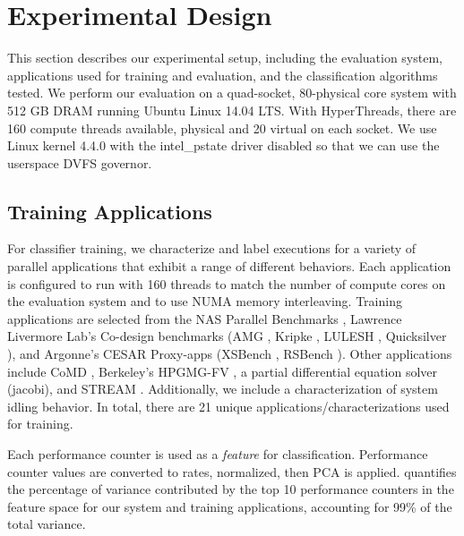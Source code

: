 \section{Experimental Design}
\label{sec:classifiers-usage}

This section describes our experimental setup, including the evaluation system, applications used for training and evaluation, and the classification algorithms tested.
We perform our evaluation on a quad-socket, 80-physical core system with 512 GB DRAM running Ubuntu Linux 14.04 LTS.
With HyperThreads, there are 160 compute threads available,  physical and 20 virtual on each socket.
We use Linux kernel 4.4.0 with the intel\_pstate driver disabled so that we can use the userspace DVFS governor.


\subsection{Training Applications}
\label{sec:setup-training}


For classifier training, we characterize and label executions for a variety of parallel applications that exhibit a range of different behaviors.
Each application is configured to run with 160 threads to match the number of compute cores on the
evaluation system and to use NUMA memory interleaving.
Training applications are selected from the NAS Parallel Benchmarks \cite{NPB}, Lawrence Livermore Lab's Co-design benchmarks (AMG \cite{BoomerAMG}, Kripke \cite{Kripke}, LULESH \cite{LULESH2}, Quicksilver \cite{Quicksilver}), and Argonne's CESAR Proxy-apps (XSBench \cite{XSBench}, RSBench \cite{RSBench}).
Other applications include CoMD \cite{CoMDGit}, Berkeley's HPGMG-FV \cite{hpgmg}, a partial differential equation solver (jacobi), and STREAM \cite{stream}.
Additionally, we include a characterization of system idling behavior.
In total, there are 21 unique applications/characterizations used for training.

Each performance counter is used as a \emph{feature} for classification.
Performance counter values are converted to rates, normalized, then PCA is applied.
 quantifies the percentage of variance contributed by the top 10 performance counters in the feature space for our system and training applications, accounting for 99\% of the total variance.

